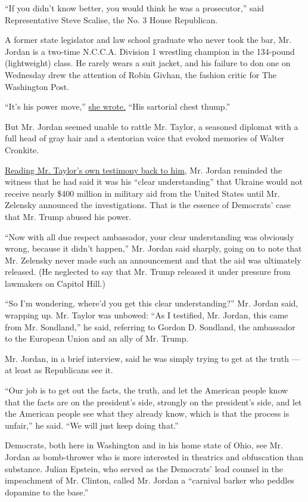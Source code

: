 ``If you didn't know better, you would think he was a prosecutor,'' said
Representative Steve Scalise, the No. 3 House Republican.

A former state legislator and law school graduate who never took the
bar, Mr. Jordan is a two-time N.C.C.A. Division 1 wrestling champion in
the 134-pound (lightweight) class. He rarely wears a suit jacket, and
his failure to don one on Wednesday drew the attention of Robin Givhan,
the fashion critic for The Washington Post.

``It's his power move,''
\href{https://www.washingtonpost.com/lifestyle/2019/11/13/love-dignity-civility-jim-jordan-put-jacket/}{she
wrote.} ``His sartorial chest thump.''

But Mr. Jordan seemed unable to rattle Mr. Taylor, a seasoned diplomat
with a full head of gray hair and a stentorian voice that evoked
memories of Walter Cronkite.

\href{https://www.youtube.com/watch?v=JCSBd580P2A}{Reading Mr. Taylor's
own testimony back to him}, Mr. Jordan reminded the witness that he had
said it was his ``clear understanding'' that Ukraine would not receive
nearly \$400 million in military aid from the United States until Mr.
Zelensky announced the investigations. That is the essence of Democrats'
case that Mr. Trump abused his power.

``Now with all due respect ambassador, your clear understanding was
obviously wrong, because it didn't happen,'' Mr. Jordan said sharply,
going on to note that Mr. Zelensky never made such an announcement and
that the aid was ultimately released. (He neglected to say that Mr.
Trump released it under pressure from lawmakers on Capitol Hill.)

``So I'm wondering, where'd you get this clear understanding?'' Mr.
Jordan said, wrapping up. Mr. Taylor was unbowed: ``As I testified, Mr.
Jordan, this came from Mr. Sondland,'' he said, referring to Gordon D.
Sondland, the ambassador to the European Union and an ally of Mr. Trump.

Mr. Jordan, in a brief interview, said he was simply trying to get at
the truth --- at least as Republicans see it.

``Our job is to get out the facts, the truth, and let the American
people know that the facts are on the president's side, strongly on the
president's side, and let the American people see what they already
know, which is that the process is unfair,'' he said. ``We will just
keep doing that.''

Democrats, both here in Washington and in his home state of Ohio, see
Mr. Jordan as bomb-thrower who is more interested in theatrics and
obfuscation than substance. Julian Epstein, who served as the Democrats'
lead counsel in the impeachment of Mr. Clinton, called Mr. Jordan a
``carnival barker who peddles dopamine to the base.''

